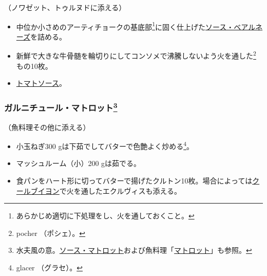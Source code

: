 \begin{recette}


（ノワゼット、トゥルヌドに添える）

\begin{itemize}
\item
  中位か小さめのアーティチョークの基底部\footnote{あらかじめ適切に下処理をし、火を通しておくこと。}に固く仕上げた\protect\hyperlink{sauce-bearnaise}{ソース・ベアルネーズ}を詰める。
\item
  新鮮で大きな牛骨髄を輪切りにしてコンソメで沸騰しないよう火を通した\footnote{pocher
    （ポシェ）。}もの10枚。
\item
  \protect\hyperlink{sauce-tomate}{トマトソース}。
\end{itemize}

\hypertarget{garniture-matelote}{%
\subsubsection[ガルニチュール・マトロット]{\texorpdfstring{ガルニチュール・マトロット\footnote{水夫風の意。\protect\hyperlink{sauce-matelote}{ソース・マトロット}および魚料理「\protect\hyperlink{matelotes-types}{マトロット}」も参照。}}{ガルニチュール・マトロット}}\label{garniture-matelote}}



（魚料理その他に添える）

\begin{itemize}
\item
  小玉ねぎ300 gは下茹でしてバターで色艶よく炒める\footnote{glacer
    （グラセ）。}。
\item
  マッシュルーム（小）200 gは茹でる。
\item
  食パンをハート形に切ってバターで揚げたクルトン10枚。場合によっては\protect\hyperlink{court-bouillon-c}{クールブイヨン}で火を通したエクルヴィスも添える。
\end{itemize}

\hypertarget{garniture-medicis}{%
}
\end{recette}
